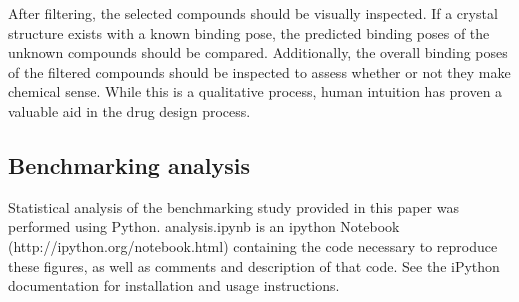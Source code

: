 After filtering, the selected compounds should be visually inspected. 
If a crystal structure exists with a known binding pose, the predicted binding poses of the unknown compounds should be compared. 
Additionally, the overall binding poses of the filtered compounds should be inspected to assess whether or not they make chemical sense. 
While this is a qualitative process, human intuition has proven a valuable aid in the drug design process\citep{Voet:2014de}.

\subsection{Benchmarking analysis}

Statistical analysis of the benchmarking study provided in this paper was performed using Python. 
analysis.ipynb is an ipython Notebook (http://ipython.org/notebook.html) containing the code necessary to reproduce these figures, as well as comments and description of that code.
See the iPython documentation for installation and usage instructions.

